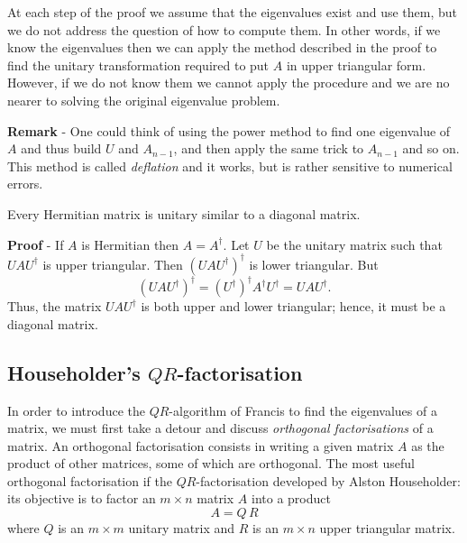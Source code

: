 \smallskip

\noindent
At each step of the proof we assume that the eigenvalues exist and use
them, but we do not address the question of how to compute them.  In
other words, if we know the eigenvalues then we can apply the method
described in the proof to find the unitary transformation required to
put $A$ in upper triangular form.  However, if we do not know them we
cannot apply the procedure and we are no nearer to solving the
original eigenvalue problem.

\noindent
\textbf{Remark} - One could think of using the power method to find
one eigenvalue of $A$ and thus build $U$ and $A_{n-1}$, and then apply
the same trick to $A_{n-1}$ and so on.  This method is called
\textit{deflation} and it works, but is rather sensitive to numerical
errors.

\begin{corollary}
  Every Hermitian matrix is unitary similar to a diagonal matrix.
\end{corollary}

\noindent
\textbf{Proof} - If $A$ is Hermitian then $A = A^{\dagger}$.  Let $U$
be the unitary matrix such that $U A U^{\dagger}$ is upper triangular.
Then $(U A U^{\dagger})^{\dagger}$ is lower triangular.  But
%
\begin{equation*}
  (U A U^{\dagger})^{\dagger} =
  (U^{\dagger})^{\dagger} A^{\dagger} U^{\dagger} =
  U A U^{\dagger} .
\end{equation*}
%
Thus, the matrix $U A U^{\dagger}$ is both upper and lower triangular;
hence, it must be a diagonal matrix.

\subsection{Householder's \texorpdfstring{$QR$}{QR}-factorisation}

In order to introduce the $QR$-algorithm of Francis to find the
eigenvalues of a matrix, we must first take a detour and discuss
\textit{orthogonal factorisations} of a matrix.  An orthogonal
factorisation consists in writing a given matrix $A$ as the product of
other matrices, some of which are orthogonal.  The most useful
orthogonal factorisation if the $QR$-factorisation developed by Alston
Householder: its objective is to factor an $m \times n$ matrix $A$
into a product
%
\begin{equation}
  A = Q \, R
  \label{eq:Ev15}
\end{equation}
%
where $Q$ is an $m \times m$ unitary matrix and $R$ is an $m \times n$
upper triangular matrix.

